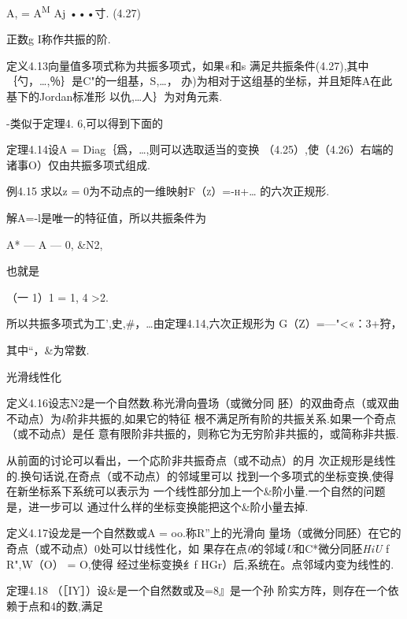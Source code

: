 \documentclass{article}
\begin{document}
A, = A\textsuperscript{M} Aj •••寸. (4.27)

正数g I称作共振的阶.

定义4.13向量值多项式称为共振多项式，如果«和s
满足共振条件(4.27),其中｛勺，\ldots{},％｝是C"的一组基，S,\ldots{}，
办)为相对于这组基的坐标，并且矩阵A在此基下的Jordan标准形
以仇,\ldots{}人｝为对角元素.

-类似于定理4. 6,可以得到下面的

定理4.14设A = Diag｛爲，\ldots{},则可以选取适当的变换
（4.25）,使（4.26）右端的诸事O）仅由共振多项式组成.\textbar{}

例4.15 求以z = 0为不动点的一维映射\textsc{F（z）=-h+}\ldots{}
的六次正规形.

解A=-l是唯一的特征值，所以共振条件为

A* --- A --- 0, \&N2,

也就是

（一 1）1 = 1, 4 \textgreater{}2.

所以共振多项式为工',史,\#，\ldots{}由定理4.14,六次正规形为
G（Z）=---"\textless{}«：3+狩，

其中``，\&为常数.

光滑线性化

定义4.16设志N2是一个自然数.称光滑向畳场（或微分同
胚）的双曲奇点（或双曲不动点）为\emph{k}阶非共振的,如果它的特征
根不满足所有阶的共振关系.如果一个奇点（或不动点）是任
意有限阶非共振的，则称它为无穷阶非共振的，或简称非共振.

从前面的讨论可以看出，一个応阶非共振奇点（或不动点）的月
次正规形是线性的.换句话说,在奇点（或不动点）的邻域里可以
找到一个多项式的坐标变换,使得在新坐标系下系统可以表示为
一个线性部分加上一个\&阶小量.一个自然的问题是，进一步可以
通过什么样的坐标变换能把这个\&阶小量去掉.

定义4.17设龙是一个自然数或A = oo.称R''上的光滑向
量场（或微分同胚）在它的奇点（或不动点）0处可以廿线性化，如
果存在点\emph{0}的邻域\emph{U}和C*微分同胚\emph{HiU} f R",W（O） =
O,使得 经过坐标变换纟f HGr）后,系统在。点邻域内变为线性的.

定理4.18 （［IY］）设\&是一个自然数或及=8』是一个孙
阶实方阵，则存在一个依赖于点和4的数,满足
\end{document}
